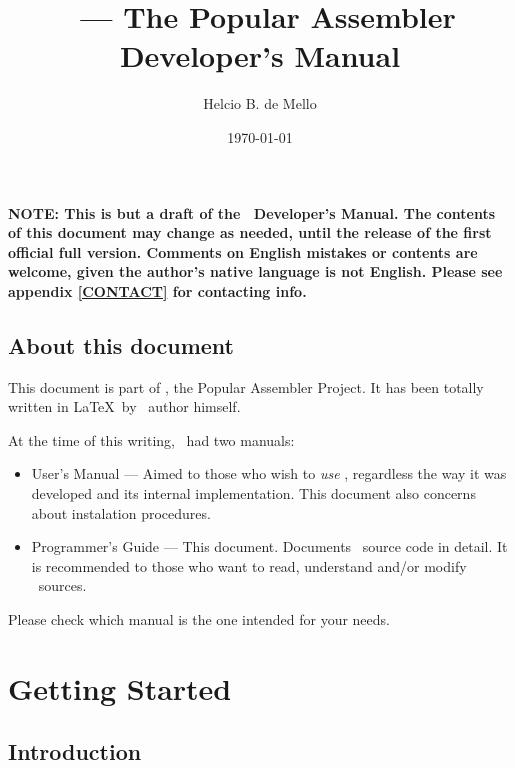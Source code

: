 \documentclass[a4paper,draft,12pt]{book}
\title{\popasm\ --- The Popular Assembler\\Developer's Manual}
\author{Helcio B. de Mello}
\date{\today}
\begin{document}
\begin{titlepage}
\maketitle
\end{titlepage}


\bf{NOTE:} This is but a draft of the \popasm\ Developer's Manual.
The contents of this document may change as needed, until the release
of the first official full version. Comments on English mistakes
or contents are welcome, given the author's native language is not
English. Please see appendix \ref{CONTACT} for contacting info.

\chapter*{About this document}
This document is part of \popasm, the Popular Assembler Project.
It has been totally written in \LaTeX\ by
\popasm\ author himself.

At the time of this writing, \popasm\ had two manuals:

\begin{itemize}
\item{User's Manual} --- Aimed to those who wish to \emph{use}
\popasm, regardless the way it was developed and its internal
implementation. This document also concerns about instalation
procedures.
\item{Programmer's Guide} --- This document. Documents \popasm\
source code in detail. It is recommended to those who want to
read, understand and/or modify \popasm\ sources.
\end{itemize}

Please check which manual is the one intended for your needs.




\tableofcontents
\newpage
\listoftables
\newpage
\listoffigures
\newpage

\part{Getting Started}

\chapter{Introduction}
\end{document}
